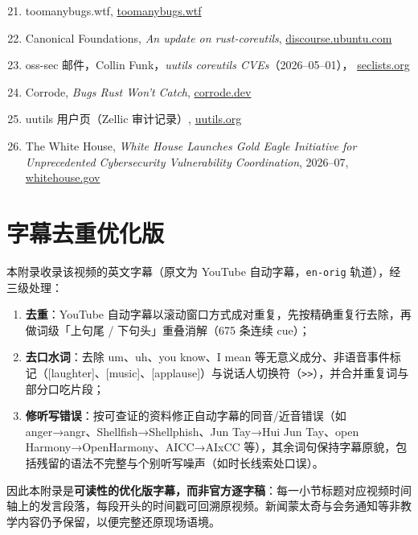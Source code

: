 \documentclass[a4paper,11pt]{article}
\begin{document}
\begin{enumerate}\setcounter{enumi}{20}
\item toomanybugs.wtf, \href{http://toomanybugs.wtf/}{toomanybugs.wtf}
\item Canonical Foundations, \emph{An update on rust-coreutils}, \href{https://discourse.ubuntu.com/t/an-update-on-rust-coreutils/80773}{discourse.ubuntu.com}
\item oss-sec 邮件，Collin Funk，\emph{uutils coreutils CVEs}（2026--05--01）， \href{https://seclists.org/oss-sec/2026/q2/332}{seclists.org}
\item Corrode, \emph{Bugs Rust Won't Catch}, \href{https://corrode.dev/blog/bugs-rust-wont-catch/}{corrode.dev}
\item uutils 用户页（Zellic 审计记录）, \href{https://uutils.org/users/}{uutils.org}
\item The White House, \emph{White House Launches Gold Eagle Initiative for Unprecedented Cybersecurity Vulnerability Coordination}, 2026--07, \href{https://www.whitehouse.gov/releases/2026/07/white-house-launches-gold-eagle-initiative-for-unprecedented-cybersecurity-vulnerability-coordination/}{whitehouse.gov}
\end{enumerate}


\appendix
\section{字幕去重优化版}

本附录收录该视频的英文字幕（原文为 YouTube 自动字幕，\texttt{en-orig} 轨道），经三级处理：

\begin{enumerate}
\item \textbf{去重}：YouTube 自动字幕以滚动窗口方式成对重复，先按精确重复行去除，再做词级「上句尾 / 下句头」重叠消解（675 条连续 cue）；
\item \textbf{去口水词}：去除 um、uh、you know、I mean 等无意义成分、非语音事件标记（[laughter]、[music]、[applause]）与说话人切换符（\texttt{>>}），并合并重复词与部分口吃片段；
\item \textbf{修听写错误}：按可查证的资料修正自动字幕的同音/近音错误（如 anger→angr、Shellfish→Shellphish、Jun Tay→Hui Jun Tay、open Harmony→OpenHarmony、AICC→AIxCC 等），其余词句保持字幕原貌，包括残留的语法不完整与个别听写噪声（如时长线索处口误）。
\end{enumerate}

因此本附录是\textbf{可读性的优化版字幕，而非官方逐字稿}：每一小节标题对应视频时间轴上的发言段落，每段开头的时间戳可回溯原视频。新闻蒙太奇与会务通知等非教学内容仍予保留，以便完整还原现场语境。

{\small}
\end{document}
